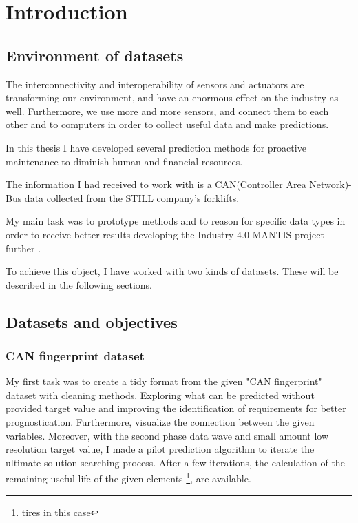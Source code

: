\chapter{Introduction}
\section{Environment of datasets}
The interconnectivity and interoperability \cite{TalebArchInsSys} of sensors and actuators are transforming our environment, and have an enormous effect on the industry as well. Furthermore, we use more and more sensors, and connect them to each other and to computers in order to collect useful data and make predictions.

In this thesis I have developed several prediction methods for proactive maintenance to diminish human and financial resources.

The information I had received to work with is a CAN(Controller Area Network)-Bus data collected from the STILL company's forklifts.

My main task was to prototype methods and to reason for specific data types in order to receive better results developing the Industry 4.0 \cite{Indfourpointzero} MANTIS project further \cite{PaliHCsCPS,HCsCPS2,GartnerIoT,HuangCPS,PaliCPS,HCsCPS,ProMain}.

To achieve this object, I have worked with two kinds of datasets. These will be described in the following sections.
\clearpage\section{Datasets and objectives}
    \subsection{CAN fingerprint dataset}
\noindent
My first task was to create a tidy format from the given "CAN fingerprint" dataset with cleaning methods. Exploring what can be predicted without provided target value and improving the identification of requirements for better prognostication. Furthermore, visualize the connection between the given variables. Moreover, with the second phase data wave and small amount low resolution target value, I made a pilot prediction algorithm to iterate the ultimate solution searching process. 
\noindent
After a few iterations, the calculation of the remaining useful life of the given elements \footnote{tires in this case}, are available. 
